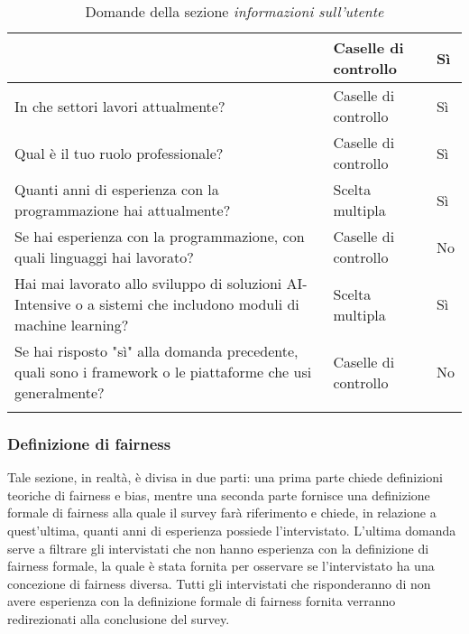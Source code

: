 \begin{longtable}{| p{} | p{} | p{} |}
&  Caselle di controllo

& Sì

\\ \hline
\rowcolor{Gray!30}
In che settori lavori attualmente?        

&  Caselle di controllo

& Sì

\\ \hline
Qual è il tuo ruolo professionale?        

&  Caselle di controllo

& Sì

\\ \hline
\rowcolor{Gray!30}
Quanti anni di esperienza con la programmazione hai attualmente?        

&  Scelta multipla

& Sì

\\ \hline
Se hai esperienza con la programmazione, con quali linguaggi hai lavorato?        

&  Caselle di controllo

& No

\\ \hline
\rowcolor{Gray!30}
Hai mai lavorato allo sviluppo di soluzioni AI-Intensive o a sistemi che includono moduli di machine learning?        

&  Scelta multipla

& Sì


\\ \hline
Se hai risposto "sì" alla domanda precedente, quali sono i framework o le piattaforme che usi generalmente?        

&  Caselle di controllo

& No


\\ \hline
\caption{Domande della sezione \emph{informazioni sull'utente}} %
\label{tab:myfirstlongtable}
\end{longtable}

\subsubsection{Definizione di fairness}
Tale sezione, in realtà, è divisa in due parti: una prima parte chiede definizioni teoriche di fairness e bias, mentre una seconda parte fornisce una definizione formale di fairness alla quale il survey farà riferimento e chiede, in relazione a quest'ultima, quanti anni di esperienza possiede l'intervistato. L'ultima domanda serve a filtrare gli intervistati che non hanno esperienza con la definizione di fairness formale, la quale è stata fornita per osservare se l'intervistato ha una concezione di fairness diversa. Tutti gli intervistati che risponderanno di non avere esperienza con la definizione formale di fairness fornita verranno redirezionati alla conclusione del survey.

